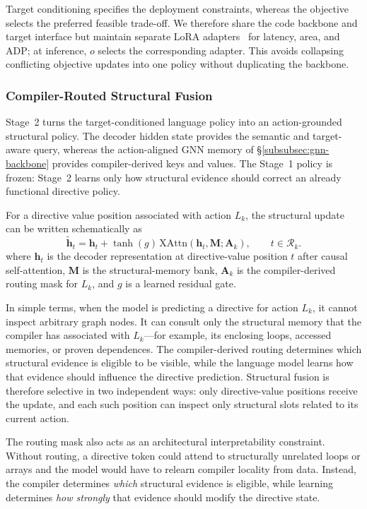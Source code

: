Target conditioning specifies the deployment constraints, whereas the objective selects the preferred feasible trade-off. We therefore share the code backbone and target interface but maintain separate LoRA adapters~\cite{hu2022lora} for latency, area, and ADP; at inference, $o$ selects the corresponding adapter. This avoids collapsing conflicting objective updates into one policy without duplicating the backbone.


\subsubsection{Compiler-Routed Structural Fusion}
\label{subsubsec:structural-fusion}

Stage~2 turns the target-conditioned language policy into an action-grounded structural policy. The decoder hidden state provides the semantic and target-aware query, whereas the action-aligned GNN memory of \S\ref{subsubsec:gnn-backbone} provides compiler-derived keys and values. 
The Stage~1 policy is frozen: Stage~2 learns only how structural evidence should correct an already functional directive policy.

For a directive value position associated with action $L_k$, the structural update can be written schematically as
%
\[
\tilde{\mathbf h}_t =
\mathbf h_t +
\tanh(g)\,
\mathrm{XAttn}(\mathbf h_t,\mathbf M;\mathbf A_k),
\qquad t\in\mathcal R_k .
\]
%
where $\mathbf h_t$ is the decoder representation at directive-value position $t$ after causal self-attention, $\mathbf M$ is the structural-memory bank, $\mathbf A_k$ is the compiler-derived routing mask  for $L_k$, and $g$ is a learned residual gate. 

In simple terms, when the model is predicting a directive for action $L_k$, it cannot inspect arbitrary graph nodes. It can consult only the structural memory that the compiler has associated with $L_k$---for example, its enclosing loops, accessed memories, or proven dependences. 
The compiler-derived routing determines which structural evidence is eligible to be visible, while the language model learns how that evidence should influence the directive prediction.
Structural fusion is therefore selective in two independent ways: only directive-value positions receive the update, and each such position can inspect only structural slots related to its current action.

The routing mask also acts as an architectural interpretability constraint. Without routing, a directive token could attend to structurally unrelated loops or arrays and the model would have to relearn compiler locality from data. 
Instead, the compiler determines \emph{which} structural evidence is eligible, while learning determines \emph{how strongly} that evidence should modify the directive state. 

